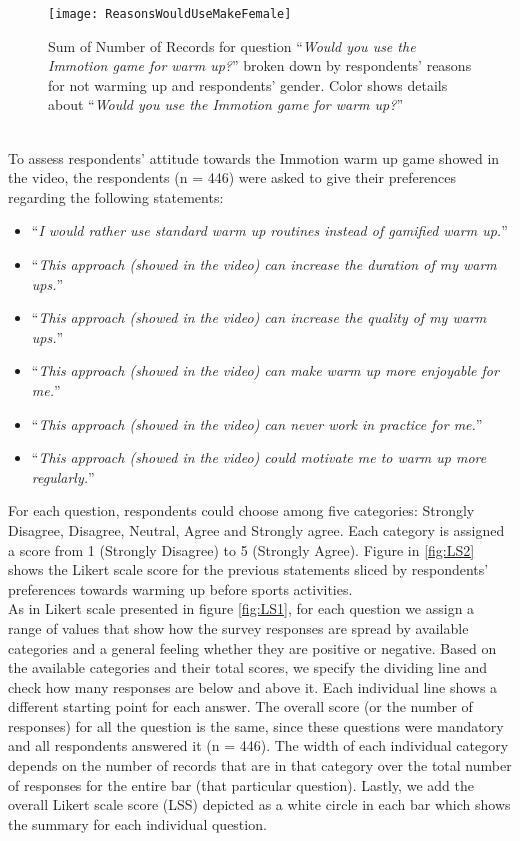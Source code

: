 \begin{figure}[h]
    \centering
    \texttt{[image: ReasonsWouldUseMakeFemale]}
    \caption{Sum of Number of Records for question ``\textit{Would you use the Immotion game for warm up?}'' broken down by respondents' reasons for not warming up and respondents' gender. Color shows details about ``\textit{Would you use the Immotion game for warm up?}''}
    \label{fig:ReasonsWouldUseMakeFemale}
\end{figure}\\
To assess respondents' attitude towards the Immotion warm up game showed in the video, the respondents (n = 446) were asked to give their preferences regarding the following statements:
\begin{itemize}
\item ``\textit{I would rather use standard warm up routines instead of gamified warm up.}''
\item ``\textit{This approach (showed in the video) can increase the duration of my warm ups.}''
\item ``\textit{This approach (showed in the video) can increase the quality of my warm ups.}''
\item ``\textit{This approach (showed in the video) can make warm up more enjoyable for me.}''
\item ``\textit{This approach (showed in the video) can never work in practice for me.}''
\item ``\textit{This approach (showed in the video) could motivate me to warm up more regularly.}''
\end{itemize}
For each question, respondents could choose among five categories: Strongly Disagree, Disagree, Neutral, Agree and Strongly agree. Each category is assigned a score from 1 (Strongly Disagree) to 5 (Strongly Agree). Figure in \ref{fig:LS2} shows the Likert scale score for the previous statements sliced by respondents' preferences towards warming up before sports activities.\\
As in Likert scale presented in figure \ref{fig:LS1}, for each question we assign a range of values that show how the survey responses are spread by available categories and a general feeling whether they are positive or negative. Based on the available categories and their total scores, we specify the dividing line and check how many responses are below and above it. Each individual line shows a different starting point for each answer. The overall score (or the number of responses) for all the question is the same, since these questions were mandatory and all respondents answered it (n = 446). The width of each individual category depends on the number of records that are in that category over the total number of responses for the entire bar (that particular question). Lastly, we add the overall Likert scale score (LSS) depicted as a white circle in each bar which shows the summary for each individual question.  
